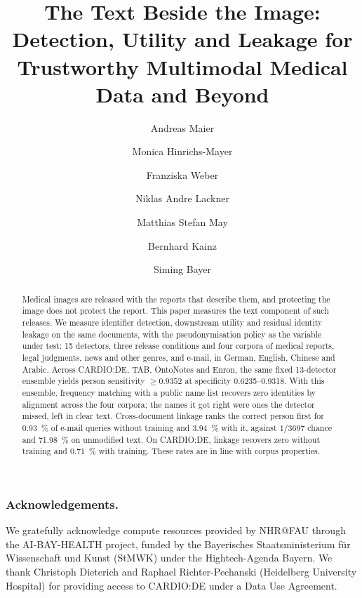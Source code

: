 \documentclass[runningheads]{llncs}
\begin{document}
\title{The Text Beside the Image: Detection, Utility and Leakage
  for Trustworthy Multimodal Medical Data and Beyond}

\author{Andreas Maier \and
  Monica Hinrichs-Mayer \and
  Franziska Weber \and
  Niklas Andre Lackner \and
  Matthias Stefan May \and
  Bernhard Kainz \and
  Siming Bayer}

\maketitle

\begin{abstract}
Medical images are released with the reports that describe them, and protecting the image does
not protect the report. This paper measures the text component of such releases. We measure identifier detection, downstream utility and residual identity
leakage on the same documents, with the pseudonymisation policy as the variable under test: 15
detectors, three release conditions and four corpora of medical reports, legal judgments, news and
other genres, and e-mail, in German, English, Chinese and Arabic. Across CARDIO:DE, TAB, OntoNotes and Enron, the same fixed 13-detector ensemble yields person sensitivity $\geq\num{0.9352}$ at specificity \num{0.6235}--\num{0.9318}. With this ensemble, frequency matching
with a public name list recovers zero identities by alignment across the four corpora; the names it
got right were ones the detector missed, left in clear text. Cross-document linkage ranks the
correct person first for \SI{0.93}{\percent} of e-mail queries without training and
\SI{3.94}{\percent} with it, against $1/3697$ chance and \SI{71.98}{\percent} on unmodified text.
On CARDIO:DE, linkage recovers zero without training and \SI{0.71}{\percent} with training. These rates are in line with corpus properties.
\end{abstract}








\subsubsection*{Acknowledgements.}
We gratefully acknowledge compute resources provided by NHR@FAU through the AI-BAY-HEALTH project, funded by the Bayerisches Staatsministerium f\"ur Wissenschaft und Kunst (StMWK) under the Hightech-Agenda Bayern. We thank Christoph Dieterich and Raphael Richter-Pechanski (Heidelberg University Hospital) for providing access to CARDIO:DE under a Data Use Agreement.



\end{document}
